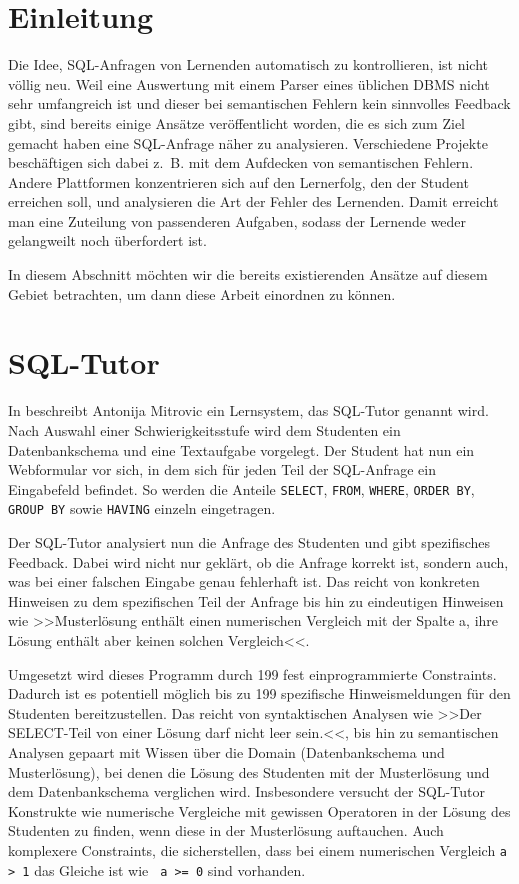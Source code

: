 \section{Einleitung}

Die Idee, SQL-Anfragen von Lernenden automatisch zu kontrollieren, ist nicht völlig neu. Weil eine Auswertung mit einem Parser eines üblichen DBMS nicht sehr umfangreich ist und dieser bei semantischen Fehlern kein sinnvolles Feedback gibt, sind bereits einige Ansätze veröffentlicht worden, die es sich zum Ziel gemacht haben eine SQL-Anfrage näher zu analysieren. Verschiedene Projekte beschäftigen sich dabei \mbox{z. B.} mit dem Aufdecken von semantischen Fehlern. Andere Plattformen konzentrieren sich auf den Lernerfolg, den der Student erreichen soll, und analysieren die Art der Fehler des Lernenden. Damit erreicht man eine Zuteilung von passenderen Aufgaben, sodass der Lernende weder gelangweilt noch überfordert ist. %

In diesem Abschnitt möchten wir die bereits existierenden Ansätze auf diesem Gebiet betrachten, um dann diese Arbeit einordnen zu können.

\section{SQL-Tutor}

In \cite{sqltut1} beschreibt Antonija Mitrovic ein Lernsystem, das SQL-Tutor genannt wird. Nach Auswahl einer Schwierigkeitsstufe wird dem Studenten ein Datenbankschema und eine Textaufgabe vorgelegt. Der Student hat nun ein Webformular vor sich, in dem sich für jeden Teil der SQL-Anfrage ein Eingabefeld befindet. So werden die Anteile \verb|SELECT|, \verb|FROM|, \verb|WHERE|, \verb|ORDER BY|, \verb|GROUP BY| sowie \verb|HAVING| einzeln eingetragen.

Der SQL-Tutor analysiert nun die Anfrage des Studenten und gibt spezifisches Feedback. Dabei wird nicht nur geklärt, ob die Anfrage korrekt ist, sondern auch, was bei einer falschen Eingabe genau fehlerhaft ist. Das reicht von konkreten Hinweisen zu dem spezifischen Teil der Anfrage bis hin zu eindeutigen Hinweisen wie >>Musterlösung enthält einen numerischen Vergleich mit der Spalte a, ihre Lösung enthält aber keinen solchen Vergleich<<.

Umgesetzt wird dieses Programm durch 199 fest einprogrammierte Constraints. Dadurch ist es potentiell möglich bis zu 199 spezifische Hinweismeldungen für den Studenten bereitzustellen. Das reicht von syntaktischen Analysen wie >>Der SELECT-Teil von einer Lösung darf nicht leer sein.<<, bis hin zu semantischen Analysen gepaart mit Wissen über die Domain (Datenbankschema und Musterlösung), bei denen die Lösung des Studenten mit der Musterlösung und dem Datenbankschema verglichen wird. Insbesondere versucht der SQL-Tutor Konstrukte wie numerische Vergleiche mit gewissen Operatoren in der Lösung des Studenten zu finden, wenn diese in der Musterlösung auftauchen. Auch komplexere Constraints, die sicherstellen, dass bei einem numerischen Vergleich \verb|a > 1| das Gleiche ist wie \verb| a >= 0| sind vorhanden. 

